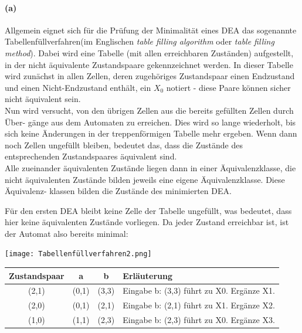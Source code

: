 
	
\paragraph{(a)}
		Allgemein eignet sich für die Prüfung der Minimalität eines DEA das sogenannte \glqq Tabellenfüllverfahren\grqq (im Englischen \textit{table filling algorithm} oder \textit{table filling method}). Dabei wird eine Tabelle (mit allen erreichbaren Zuständen) aufgestellt, in der nicht äquivalente Zustandspaare gekennzeichnet werden. In dieser Tabelle wird zunächst in allen Zellen, deren zugehöriges Zustandspaar einen Endzustand und einen Nicht-Endzustand enthält, ein $X_0$ notiert - diese Paare können sicher nicht äquivalent sein.\\		
		Nun wird versucht, von den übrigen Zellen aus die bereits gefüllten Zellen durch Über- gänge aus dem Automaten zu erreichen. Dies wird so lange wiederholt, bis sich keine Änderungen in der treppenförmigen Tabelle mehr ergeben. Wenn dann noch Zellen ungefüllt bleiben, bedeutet das, dass die Zustände des entsprechenden Zustandspaares äquivalent sind.\\
		Alle zueinander äquivalenten Zustände liegen dann in einer Äquivalenzklasse, die nicht äquivalenten Zustände bilden jeweils eine eigene Äquivalenzklasse. Diese Äquivalenz- klassen bilden die Zustände des minimierten DEA.
		
		Für den ersten DEA bleibt keine Zelle der Tabelle ungefüllt, was bedeutet, dass hier keine äquivalenten Zustände vorliegen. Da jeder Zustand erreichbar ist, ist der Automat also bereits minimal:
	
	\texttt{[image: Tabellenfüllverfahren2.png]}
	
	\begin{tabular}{c|c|c|l}
		\textbf{Zustandspaar} & \textbf{a} & \textbf{b} & \textbf{Erläuterung} \\
		\hline
		(2,1)                 & (0,1)      & (3,3)      & Eingabe b: (3,3) führt zu X0. Ergänze X1. \\
		\hline
		(2,0)                 & (0,1)      & (2,1)      & Eingabe b: (2,1) führt zu X1. Ergänze X2. \\
		\hline
		(1,0)                 & (1,1)      & (2,3)      & Eingabe b: (2,3) führt zu X0. Ergänze X3. \\
	\end{tabular} \\

